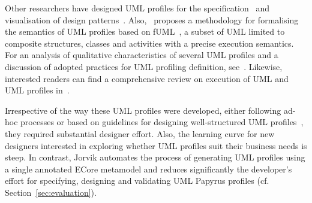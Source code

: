Other researchers have designed UML profiles for the 
specification~\cite{Debnath2006:ICCSA,Mak2004:ICSE} and visualisation of 
design patterns~\cite{Dong2007:TSE}. 
Also,~\cite{tatibouet2014formalizing} proposes a methodology for formalising the semantics of UML profiles based on fUML~\cite{fuml}, a subset of UML
limited to composite structures, classes and activities with a precise execution semantics. 
For an analysis of qualitative characteristics of several UML profiles and a discussion of adopted practices for UML profiling definition, see~\cite{Pardillo2010:MODELS}.
Likewise, interested readers can find a comprehensive review on execution of UML and UML profiles in~\cite{ciccozzi2018execution}.

Irrespective of the way these UML profiles were developed, either 
following ad-hoc processes or based on guidelines for designing well-structured 
UML profiles~\cite{FuentesFernandez2004:UMLME,Selic2007:ISORC},
they required substantial designer effort. Also, the learning 
curve for new designers interested in exploring whether UML profiles suit their 
business needs is steep.
In contrast, Jorvik automates the process of generating UML profiles using a single annotated ECore metamodel and reduces significantly the developer's effort for specifying, designing and validating UML Papyrus profiles (cf. Section~\ref{sec:evaluation}).

